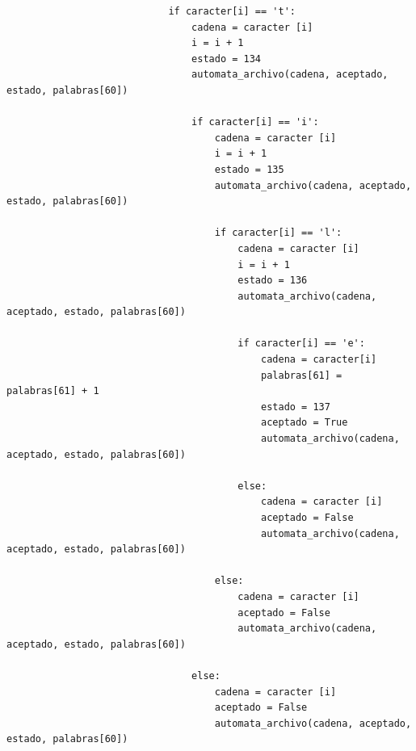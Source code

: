 \documentclass{article}
\begin{document}
\begin{flushleft}
\begin{lstlisting}
                            if caracter[i] == 't':
                                cadena = caracter [i]
                                i = i + 1
                                estado = 134
                                automata_archivo(cadena, aceptado, estado, palabras[60])
                                
                                if caracter[i] == 'i':
                                    cadena = caracter [i]
                                    i = i + 1
                                    estado = 135
                                    automata_archivo(cadena, aceptado, estado, palabras[60])
                                    
                                    if caracter[i] == 'l':
                                        cadena = caracter [i]
                                        i = i + 1
                                        estado = 136
                                        automata_archivo(cadena, aceptado, estado, palabras[60])
                                        
                                        if caracter[i] == 'e':
                                            cadena = caracter[i]
                                            palabras[61] = palabras[61] + 1
                                            estado = 137
                                            aceptado = True
                                            automata_archivo(cadena, aceptado, estado, palabras[60])
                                            
                                        else:
                                            cadena = caracter [i]
                                            aceptado = False
                                            automata_archivo(cadena, aceptado, estado, palabras[60])
                                            
                                    else:
                                        cadena = caracter [i]
                                        aceptado = False
                                        automata_archivo(cadena, aceptado, estado, palabras[60])
                                        
                                else:
                                    cadena = caracter [i]
                                    aceptado = False
                                    automata_archivo(cadena, aceptado, estado, palabras[60])
                                    

\end{lstlisting}
\end{flushleft}
\end{document}
